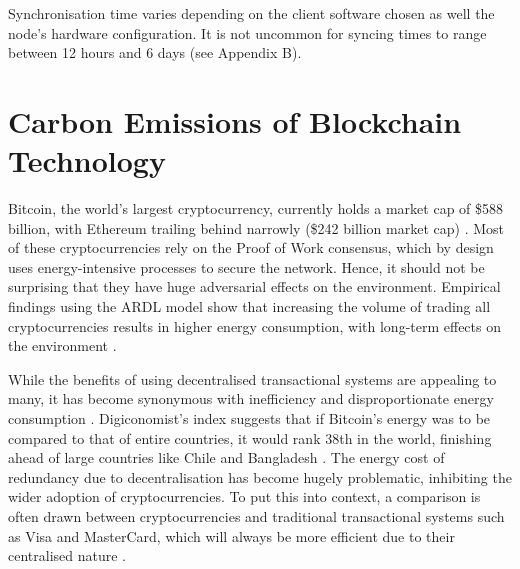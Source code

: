 Synchronisation time varies depending on the client software chosen as well the node's hardware configuration. It is not uncommon for syncing times to range between 12 hours and 6 days (see Appendix B).



\section{Carbon Emissions of Blockchain Technology }

Bitcoin, the world's largest cryptocurrency, currently holds a market cap of \$588 billion, with Ethereum trailing behind narrowly (\$242 billion market cap) \cite{BitcoinCoinMarketCap}. Most of these cryptocurrencies rely on the Proof of Work consensus, which by design uses energy-intensive processes to secure the network. Hence, it should not be surprising that they have huge adversarial effects on the environment. Empirical findings using the ARDL model show that increasing the volume of trading all cryptocurrencies results in higher energy consumption, with long-term effects on the environment \cite{Schinckus2020Crypto-currenciesConsumption}. \newline 

While the benefits of using decentralised transactional systems are appealing to many, it has become synonymous with inefficiency and disproportionate energy consumption \cite{DeVriesBitcoinsProblem}. Digiconomist's index suggests that if Bitcoin's energy was to be compared to that of entire countries, it would rank 38th in the world, finishing ahead of large countries like Chile and Bangladesh \cite{BitcoinDigiconomist}. The energy cost of redundancy due to decentralisation has become hugely problematic, inhibiting the wider adoption of cryptocurrencies. To put this into context, a comparison is often drawn between cryptocurrencies and traditional transactional systems such as Visa and MasterCard, which will always be more efficient due to their centralised nature \cite{Kohli2023AnSolutions}.  

